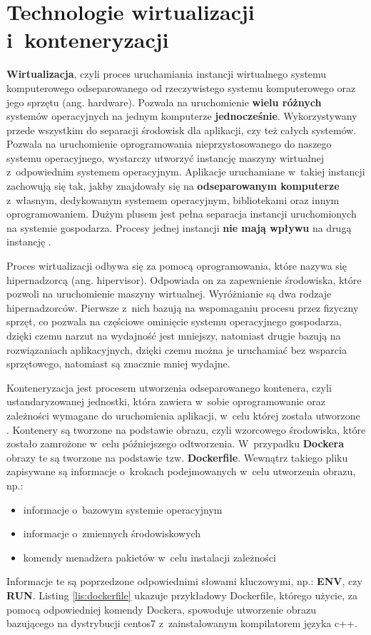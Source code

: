\section{Technologie wirtualizacji i~konteneryzacji}

\textbf{Wirtualizacja}, czyli proces uruchamiania instancji wirtualnego systemu komputerowego odseparowanego od rzeczywistego systemu komputerowego oraz jego sprzętu (ang. hardware). Pozwala na uruchomienie \textbf{wielu różnych} systemów operacyjnych na jednym komputerze \textbf{jednocześnie}. Wykorzystywany przede wszystkim do separacji środowisk dla aplikacji, czy też całych systemów. Pozwala na uruchomienie oprogramowania nieprzystosowanego do naszego systemu operacyjnego, wystarczy utworzyć instancję maszyny wirtualnej z~odpowiednim systemem operacyjnym. Aplikacje uruchamiane w~takiej instancji zachowują się tak, jakby znajdowały się na \textbf{odseparowanym komputerze} z~własnym, dedykowanym systemem operacyjnym, bibliotekami oraz innym oprogramowaniem. Dużym plusem jest pełna separacja instancji uruchomionych na systemie gospodarza. Procesy jednej instancji \textbf{nie mają wpływu} na drugą instancję \cite{Virt}.\par

Proces wirtualizacji odbywa się za pomocą oprogramowania, które nazywa się hipernadzorcą (ang. hipervisor). Odpowiada on za zapewnienie środowiska, które pozwoli na uruchomienie maszyny wirtualnej. Wyróżnianie są dwa rodzaje hipernadzorców. Pierwsze z~nich bazują na wspomaganiu procesu przez fizyczny sprzęt, co pozwala na częściowe ominięcie systemu operacyjnego gospodarza, dzięki czemu narzut na wydajność jest mniejszy, natomiast drugie bazują na rozwiązaniach aplikacyjnych, dzięki czemu można je uruchamiać bez wsparcia sprzętowego, natomiast są znacznie mniej wydajne.

Konteneryzacja jest procesem utworzenia odseparowanego kontenera, czyli ustandaryzowanej jednostki, która zawiera w~sobie oprogramowanie oraz zależności wymagane do uruchomienia aplikacji, w~celu której została utworzone \cite{Kont}. Kontenery są tworzone na podstawie obrazu, czyli wzorcowego środowiska, które zostało zamrożone w~celu późniejszego odtworzenia. W~przypadku \textbf{Dockera} obrazy te są tworzone na podstawie tzw. \textbf{Dockerfile}. Wewnątrz takiego pliku zapisywane są informacje o~krokach podejmowanych w~celu utworzenia obrazu, np.:
\begin{itemize}
\item informacje o~bazowym systemie operacyjnym
\item informacje o~zmiennych środowiskowych
\item komendy menadżera pakietów w~celu instalacji zależności
\end{itemize}
Informacje te są poprzedzone odpowiednimi słowami kluczowymi, np.: \textbf{ENV}, czy \textbf{RUN}. Listing \ref{lis:dockerfile} ukazuje przykładowy Dockerfile, którego użycie, za pomocą odpowiedniej komendy Dockera, spowoduje utworzenie obrazu bazującego na dystrybucji centos7 z~zainstalowanym kompilatorem języka c++.

